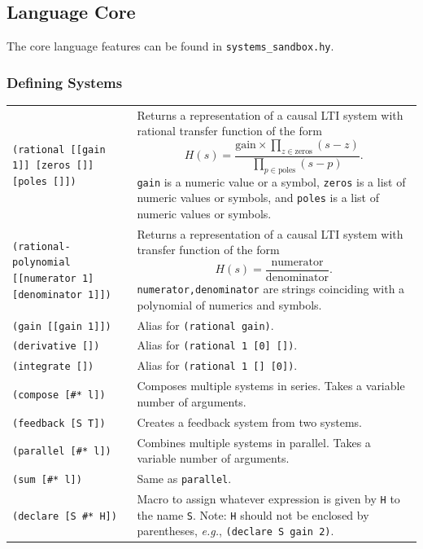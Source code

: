 \documentclass[11pt,letter]{article}
\begin{document}
\subsection{Language Core}

The core language features can be found in \lstinline!systems_sandbox.hy!.

\subsubsection{Defining Systems}

\begin{longtable}{ p{} p{} }
  \texttt{(rational [[gain 1]] [zeros []] [poles []])}
  &
  Returns a representation of a causal LTI system with rational transfer function of the form
  \begin{equation*}
    H(s) = \frac{\mathrm{gain}\times\prod_{z\in\mathrm{zeros}}(s-z)}{\prod_{p\in\mathrm{poles}}(s-p)}.
  \end{equation*}
  \texttt{gain} is a numeric value or a symbol, \texttt{zeros} is a list of numeric values or symbols, and \texttt{poles} is a list of numeric values or symbols.
  \\

  \texttt{(rational-polynomial [[numerator 1] [denominator 1]])}
  &
  Returns a representation of a causal LTI system with transfer function of the form
  \begin{equation*}
    H(s) = \frac{\mathrm{numerator}}{\mathrm{denominator}}.
  \end{equation*}
  \texttt{numerator,denominator} are strings coinciding with a polynomial of numerics and symbols.
  \\

  \texttt{(gain [[gain 1]])}
  &
  Alias for \texttt{(rational gain)}. \\

  \texttt{(derivative [])}
  &
  Alias for \texttt{(rational 1 [0] [])}. \\

  \texttt{(integrate [])}
  &
  Alias for \texttt{(rational 1 [] [0])}. \\

  \texttt{(compose [\#* l])}
  &
  Composes multiple systems in series. Takes a variable number of arguments. \\

  \texttt{(feedback [S T])}
  &
  Creates a feedback system from two systems. \\

  \texttt{(parallel [\#* l])}
  &
  Combines multiple systems in parallel. Takes a variable number of arguments. \\

  \texttt{(sum [\#* l])}
  &
  Same as \texttt{parallel}. \\

  \texttt{(declare [S \#* H])}
  &
  Macro to assign whatever expression is given by \texttt{H} to the name \texttt{S}.
  Note: \texttt{H} should not be enclosed by parentheses, \textit{e.g.}, \texttt{(declare S gain 2)}. \\

\end{longtable}
\end{document}
